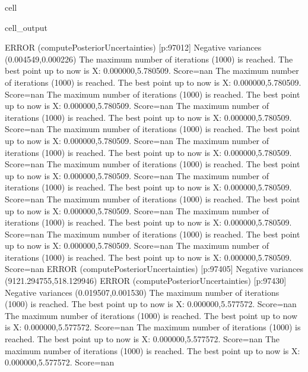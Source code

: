 \documentclass[letterpaper,10pt,english]{jupyterBook}
\begin{document}
\begin{sphinxuseclass}{cell}
\begin{sphinxVerbatimOutput}
\begin{sphinxuseclass}{cell_output}
\begin{sphinxVerbatim}[commandchars=\\\{\}]
ERROR (compute\PYGZus{}Posterior\PYGZus{}Uncertainties) [p:97012] Negative variances (0.004549,\PYGZhy{}0.000226)
The maximum number of iterations (1000) is reached. The best point up to now is X: \PYGZob{}0.000000,\PYGZhy{}5.780509\PYGZcb{}. Score=\PYGZhy{}nan
The maximum number of iterations (1000) is reached. The best point up to now is X: \PYGZob{}0.000000,\PYGZhy{}5.780509\PYGZcb{}. Score=\PYGZhy{}nan
The maximum number of iterations (1000) is reached. The best point up to now is X: \PYGZob{}0.000000,\PYGZhy{}5.780509\PYGZcb{}. Score=\PYGZhy{}nan
The maximum number of iterations (1000) is reached. The best point up to now is X: \PYGZob{}0.000000,\PYGZhy{}5.780509\PYGZcb{}. Score=\PYGZhy{}nan
The maximum number of iterations (1000) is reached. The best point up to now is X: \PYGZob{}0.000000,\PYGZhy{}5.780509\PYGZcb{}. Score=\PYGZhy{}nan
The maximum number of iterations (1000) is reached. The best point up to now is X: \PYGZob{}0.000000,\PYGZhy{}5.780509\PYGZcb{}. Score=\PYGZhy{}nan
The maximum number of iterations (1000) is reached. The best point up to now is X: \PYGZob{}0.000000,\PYGZhy{}5.780509\PYGZcb{}. Score=\PYGZhy{}nan
The maximum number of iterations (1000) is reached. The best point up to now is X: \PYGZob{}0.000000,\PYGZhy{}5.780509\PYGZcb{}. Score=\PYGZhy{}nan
The maximum number of iterations (1000) is reached. The best point up to now is X: \PYGZob{}0.000000,\PYGZhy{}5.780509\PYGZcb{}. Score=\PYGZhy{}nan
The maximum number of iterations (1000) is reached. The best point up to now is X: \PYGZob{}0.000000,\PYGZhy{}5.780509\PYGZcb{}. Score=\PYGZhy{}nan
The maximum number of iterations (1000) is reached. The best point up to now is X: \PYGZob{}0.000000,\PYGZhy{}5.780509\PYGZcb{}. Score=\PYGZhy{}nan
The maximum number of iterations (1000) is reached. The best point up to now is X: \PYGZob{}0.000000,\PYGZhy{}5.780509\PYGZcb{}. Score=\PYGZhy{}nan
ERROR (compute\PYGZus{}Posterior\PYGZus{}Uncertainties) [p:97405] Negative variances (9121.294755,\PYGZhy{}518.129946)
ERROR (compute\PYGZus{}Posterior\PYGZus{}Uncertainties) [p:97430] Negative variances (\PYGZhy{}0.019507,\PYGZhy{}0.001530)
The maximum number of iterations (1000) is reached. The best point up to now is X: \PYGZob{}0.000000,\PYGZhy{}5.577572\PYGZcb{}. Score=\PYGZhy{}nan
The maximum number of iterations (1000) is reached. The best point up to now is X: \PYGZob{}0.000000,\PYGZhy{}5.577572\PYGZcb{}. Score=\PYGZhy{}nan
The maximum number of iterations (1000) is reached. The best point up to now is X: \PYGZob{}0.000000,\PYGZhy{}5.577572\PYGZcb{}. Score=\PYGZhy{}nan
The maximum number of iterations (1000) is reached. The best point up to now is X: \PYGZob{}0.000000,\PYGZhy{}5.577572\PYGZcb{}. Score=\PYGZhy{}nan

\end{sphinxVerbatim}
\end{sphinxuseclass}
\end{sphinxVerbatimOutput}
\end{sphinxuseclass}
\end{document}
